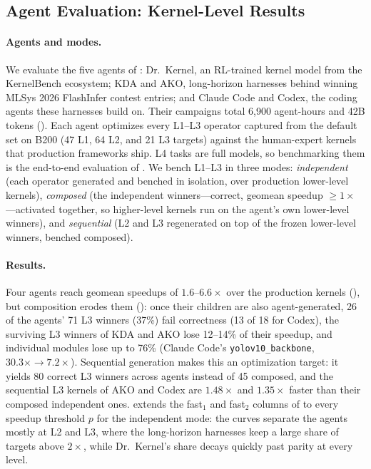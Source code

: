 \subsection{Agent Evaluation: Kernel-Level Results}
\label{fastkernels:sec:eval-agents}

\paragraph{Agents and modes.}
We evaluate the five agents of : Dr.~Kernel, an RL-trained kernel model from the KernelBench ecosystem; KDA and AKO, long-horizon harnesses behind winning MLSys 2026 FlashInfer contest entries; and Claude Code and Codex, the coding agents these harnesses build on.
Their campaigns total 6{,}900 agent-hours and 42B tokens ().
Each agent optimizes every L1--L3 operator captured from the default set on B200 (47 L1, 64 L2, and 21 L3 targets) against the human-expert kernels that production frameworks ship.
L4 tasks are full models, so benchmarking them is the end-to-end evaluation of .
We bench L1--L3 in three modes:
\emph{independent} (each operator generated and benched in isolation, over production lower-level kernels),
\emph{composed} (the independent winners---correct, geomean speedup $\geq 1\times$---activated together, so higher-level kernels run on the agent's own lower-level winners), and
\emph{sequential} (L2 and L3 regenerated on top of the frozen lower-level winners, benched composed).

\paragraph{Results.}
Four agents reach geomean speedups of $1.6$--$6.6\times$ over the production kernels (), but composition erodes them (): once their children are also agent-generated, 26 of the agents' 71 L3 winners (37\%) fail correctness (13 of 18 for Codex), the surviving L3 winners of KDA and AKO lose 12--14\% of their speedup, and individual modules lose up to 76\% (Claude Code's \texttt{yolov10\_backbone}, $30.3\times \to 7.2\times$).
Sequential generation makes this an optimization target: it yields 80 correct L3 winners across agents instead of 45 composed, and the sequential L3 kernels of AKO and Codex are $1.48\times$ and $1.35\times$ faster than their composed independent ones.
 extends the fast$_1$ and fast$_2$ columns of  to every speedup threshold $p$ for the independent mode: the curves separate the agents mostly at L2 and L3, where the long-horizon harnesses keep a large share of targets above $2\times$, while Dr.~Kernel's share decays quickly past parity at every level.

